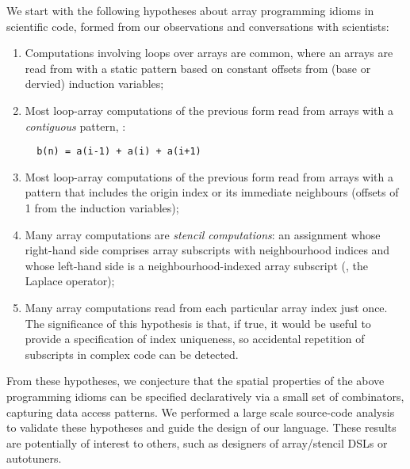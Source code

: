 
\noindent
We start with the following hypotheses about array programming idioms
in scientific code, formed from our observations and conversations
with scientists:
\begin{enumerate}[leftmargin=2em]
\item Computations involving loops over arrays are common, where an
  arrays are read from with a static pattern based on constant offsets
  from (base or dervied) induction variables;

\item Most loop-array computations of the previous form read from
  arrays with a \emph{contiguous} pattern, \eg{}:
%
\begin{verbatim}
  b(n) = a(i-1) + a(i) + a(i+1)
\end{verbatim}
%
\item Most loop-array computations of the previous form read from
  arrays with a pattern that includes the origin index or its
  immediate neighbours (offsets of 1 from the induction variables);

\item Many array computations are \emph{stencil computations}: an
  assignment whose right-hand side comprises array subscripts with
  neighbourhood indices and whose left-hand side is a
  neighbourhood-indexed array subscript (\eg{}, the Laplace operator);

\item Many array computations read from each particular array index just
  once. The significance of this hypothesis is that, if true, it would
  be useful to provide a specification of index uniqueness, so accidental
  repetition of subscripts in complex code can be detected.
\end{enumerate}
%
From these hypotheses, we conjecture that the spatial properties of
the above programming idioms can be specified declaratively via a
small set of combinators, capturing data access patterns. %
We performed a large scale source-code analysis to validate these
hypotheses and guide the design of our language. These results are
potentially of interest to others, such as designers of array/stencil DSLs
or autotuners.

